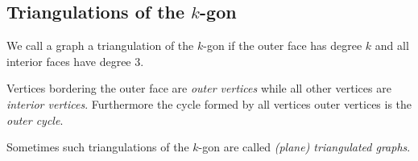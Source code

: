 \subsection{Triangulations of the $k$-gon}

\begin{defi}
We call a graph a triangulation of the $k$-gon if the outer face has degree $k$ and all interior faces have degree $3$.
\end{defi}
Vertices bordering the outer face are \emph{outer vertices} while all other vertices are \emph{interior vertices}. Furthermore the cycle formed by all vertices outer vertices is the \emph{outer cycle}.

Sometimes such triangulations of the $k$-gon are called \emph{(plane) triangulated graphs}.
